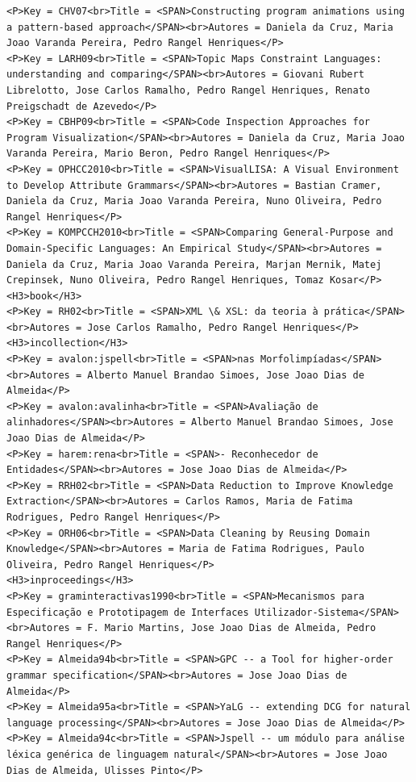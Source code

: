 \documentclass[11pt,a4paper]{report}
\begin{document}
\begin{appendices}
\begin{lstlisting}
<P>Key = CHV07<br>Title = <SPAN>Constructing program animations using a pattern-based approach</SPAN><br>Autores = Daniela da Cruz, Maria Joao Varanda Pereira, Pedro Rangel Henriques</P>
<P>Key = LARH09<br>Title = <SPAN>Topic Maps Constraint Languages: understanding and comparing</SPAN><br>Autores = Giovani Rubert Librelotto, Jose Carlos Ramalho, Pedro Rangel Henriques, Renato Preigschadt de Azevedo</P>
<P>Key = CBHP09<br>Title = <SPAN>Code Inspection Approaches for Program Visualization</SPAN><br>Autores = Daniela da Cruz, Maria Joao Varanda Pereira, Mario Beron, Pedro Rangel Henriques</P>
<P>Key = OPHCC2010<br>Title = <SPAN>VisualLISA: A Visual Environment to Develop Attribute Grammars</SPAN><br>Autores = Bastian Cramer, Daniela da Cruz, Maria Joao Varanda Pereira, Nuno Oliveira, Pedro Rangel Henriques</P>
<P>Key = KOMPCCH2010<br>Title = <SPAN>Comparing General-Purpose and Domain-Specific Languages: An Empirical Study</SPAN><br>Autores = Daniela da Cruz, Maria Joao Varanda Pereira, Marjan Mernik, Matej Crepinsek, Nuno Oliveira, Pedro Rangel Henriques, Tomaz Kosar</P>
<H3>book</H3>
<P>Key = RH02<br>Title = <SPAN>XML \& XSL: da teoria à prática</SPAN><br>Autores = Jose Carlos Ramalho, Pedro Rangel Henriques</P>
<H3>incollection</H3>
<P>Key = avalon:jspell<br>Title = <SPAN>nas Morfolimpíadas</SPAN><br>Autores = Alberto Manuel Brandao Simoes, Jose Joao Dias de Almeida</P>
<P>Key = avalon:avalinha<br>Title = <SPAN>Avaliação de alinhadores</SPAN><br>Autores = Alberto Manuel Brandao Simoes, Jose Joao Dias de Almeida</P>
<P>Key = harem:rena<br>Title = <SPAN>- Reconhecedor de Entidades</SPAN><br>Autores = Jose Joao Dias de Almeida</P>
<P>Key = RRH02<br>Title = <SPAN>Data Reduction to Improve Knowledge Extraction</SPAN><br>Autores = Carlos Ramos, Maria de Fatima Rodrigues, Pedro Rangel Henriques</P>
<P>Key = ORH06<br>Title = <SPAN>Data Cleaning by Reusing Domain Knowledge</SPAN><br>Autores = Maria de Fatima Rodrigues, Paulo Oliveira, Pedro Rangel Henriques</P>
<H3>inproceedings</H3>
<P>Key = graminteractivas1990<br>Title = <SPAN>Mecanismos para Especificação e Prototipagem de Interfaces Utilizador-Sistema</SPAN><br>Autores = F. Mario Martins, Jose Joao Dias de Almeida, Pedro Rangel Henriques</P>
<P>Key = Almeida94b<br>Title = <SPAN>GPC -- a Tool for higher-order grammar specification</SPAN><br>Autores = Jose Joao Dias de Almeida</P>
<P>Key = Almeida95a<br>Title = <SPAN>YaLG -- extending DCG for natural language processing</SPAN><br>Autores = Jose Joao Dias de Almeida</P>
<P>Key = Almeida94c<br>Title = <SPAN>Jspell -- um módulo para análise léxica genérica de linguagem natural</SPAN><br>Autores = Jose Joao Dias de Almeida, Ulisses Pinto</P>

\end{lstlisting}
\end{appendices}
\end{document}
